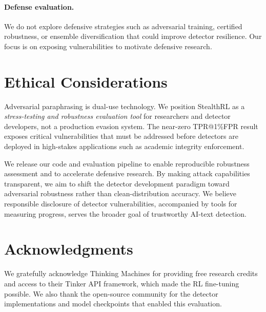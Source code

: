 \documentclass[11pt]{article}
\begin{document}
\paragraph{Defense evaluation.} We do not explore defensive strategies such as adversarial training, certified robustness, or ensemble diversification that could improve detector resilience. Our focus is on exposing vulnerabilities to motivate defensive research.

\section{Ethical Considerations}

Adversarial paraphrasing is dual-use technology. We position StealthRL as a \emph{stress-testing and robustness evaluation tool} for researchers and detector developers, not a production evasion system. The near-zero TPR@1\%FPR result exposes critical vulnerabilities that must be addressed before detectors are deployed in high-stakes applications such as academic integrity enforcement.

We release our code and evaluation pipeline to enable reproducible robustness assessment and to accelerate defensive research. By making attack capabilities transparent, we aim to shift the detector development paradigm toward adversarial robustness rather than clean-distribution accuracy. We believe responsible disclosure of detector vulnerabilities, accompanied by tools for measuring progress, serves the broader goal of trustworthy AI-text detection.

\section*{Acknowledgments}

We gratefully acknowledge Thinking Machines for providing free research credits and access to their Tinker API framework, which made the RL fine-tuning possible. We also thank the open-source community for the detector implementations and model checkpoints that enabled this evaluation.


\clearpage

\appendix
\end{document}
